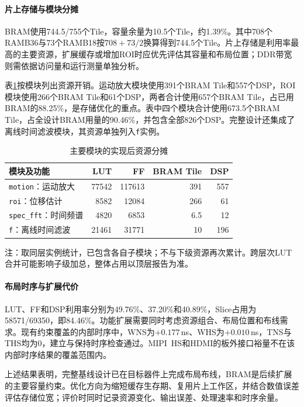 \paragraph{片上存储与模块分摊}
BRAM使用744.5/755个Tile，容量余量为10.5个Tile，约1.39\%。其中708个RAMB36与73个RAMB18按$708+73/2$换算得到744.5个Tile。片上存储是利用率最高的主要资源，扩展缓存或增加ROI时应优先评估其容量和布局位置；DDR带宽则需依据访问量和运行测量单独分析。

表\ref{tab:resource-modules}按模块列出资源开销。运动放大模块使用391个BRAM Tile和557个DSP，ROI模块使用266个BRAM Tile和61个DSP，两者合计使用657个BRAM Tile，占已用BRAM的88.25\%，是存储优化的重点。表中四个模块合计使用673.5个BRAM Tile，占全设计BRAM用量的90.46\%，并包含全部826个DSP。完整设计还集成了离线时间滤波模块，其资源单独列入\texttt{f}实例。

\begin{table}[htbp]
\centering\small
\caption{主要模块的实现后资源分摊}\label{tab:resource-modules}
\begin{tabular}{@{}lrrrr@{}}
\toprule
模块及功能 & LUT & FF & BRAM Tile & DSP \\
\midrule
\texttt{motion}：运动放大 & 77542 & 117613 & 391 & 557 \\
\texttt{roi}：位移估计 & 8582 & 12084 & 266 & 61 \\
\texttt{spec\_fft}：时间频谱 & 4820 & 6853 & 6.5 & 12 \\
\texttt{f}：离线时间滤波 & 21461 & 31771 & 10 & 196 \\
\bottomrule
\end{tabular}
\par\smallskip
\begin{minipage}{\linewidth}\small
注：取同层实例统计，已包含各自子模块；不与下级资源再次累计。跨层次LUT合并可能影响子级加总，整体占用以顶层报告为准。
\end{minipage}
\end{table}

\paragraph{布局时序与扩展代价}
LUT、FF和DSP利用率分别为49.76\%、37.20\%和40.89\%，Slice占用为58571/69350，即84.46\%。功能扩展需要同时考虑资源组合、布局位置和布线需求。现有约束覆盖的内部时序中，WNS为$+0.177$\,ns、WHS为$+0.010$\,ns，TNS与THS均为0，建立与保持时序检查通过。MIPI~HS和HDMI的板外接口裕量不在该内部时序结果的覆盖范围内。

上述结果表明，完整基线设计已在目标器件上完成布局布线，BRAM是后续扩展的主要容量约束。优化方向为缩短缓存生存期、复用片上工作区，并结合数值误差评估存储位宽；评价时同时记录资源变化、输出误差、处理速率和时序余量。

